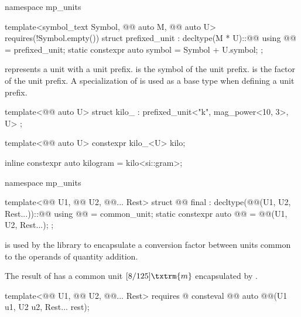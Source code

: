 \begin{codeblock}
namespace mp_units {

template<symbol_text Symbol, @@ auto M, @@ auto U>
  requires(!Symbol.empty())
struct prefixed_unit : decltype(M * U)::@@ {
  using @@ = prefixed_unit;
  static constexpr auto symbol = Symbol + U.symbol;
};

}
\end{codeblock}

\pnum
{} represents a unit with a unit prefix.
 is the symbol of the unit prefix.
 is the factor of the unit prefix.
A specialization of  is used as a base type when defining a unit prefix.
\begin{example}
\begin{codeblock}
template<@@ auto U>
struct kilo_ : prefixed_unit<"k", mag_power<10, 3>, U> {};

template<@@ auto U>
constexpr kilo_<U> kilo;

inline constexpr auto kilogram = kilo<si::gram>;
\end{codeblock}
\end{example}

\begin{codeblock}
namespace mp_units {

template<@@ U1, @@ U2, @@... Rest>
struct @@ final : decltype(@@(U1{}, U2{}, Rest{}...))::@@
{
  using @@ = common_unit;
  static constexpr auto @@ = @@(U1{}, U2{}, Rest{}...);
};

}
\end{codeblock}

\pnum
{} is used by the library
to encapsulate a conversion factor between units
common to the operands of quantity addition.
\begin{example}
The result of 
has a common unit $[8/125] \txtrm{ m}$
encapsulated by .
\end{example}

\begin{itemdecl}
template<@@ U1, @@ U2, @@... Rest>
  requires @\seebelownc@
consteval @@ auto @@(U1 u1, U2 u2, Rest... rest);
\end{itemdecl}

